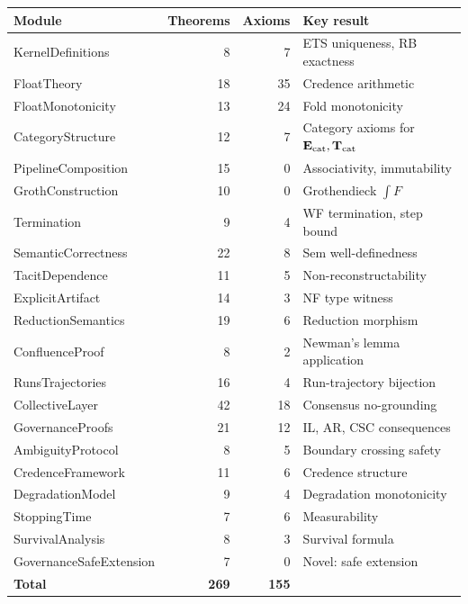 \begin{center}
\begin{tabular}{lrrl}
\toprule
Module & Theorems & Axioms & Key result \\
\midrule
KernelDefinitions & 8 & 7 & ETS uniqueness, RB exactness \\
FloatTheory & 18 & 35 & Credence arithmetic \\
FloatMonotonicity & 13 & 24 & Fold monotonicity \\
CategoryStructure & 12 & 7 & Category axioms for $\mathbf{E}_{\mathrm{cat}}, \mathbf{T}_{\mathrm{cat}}$ \\
PipelineComposition & 15 & 0 & Associativity, immutability \\
GrothConstruction & 10 & 0 & Grothendieck $\int F$ \\
Termination & 9 & 4 & WF termination, step bound \\
SemanticCorrectness & 22 & 8 & Sem well-definedness \\
TacitDependence & 11 & 5 & Non-reconstructability \\
ExplicitArtifact & 14 & 3 & NF type witness \\
ReductionSemantics & 19 & 6 & Reduction morphism \\
ConfluenceProof & 8 & 2 & Newman's lemma application \\
RunsTrajectories & 16 & 4 & Run-trajectory bijection \\
CollectiveLayer & 42 & 18 & Consensus no-grounding \\
GovernanceProofs & 21 & 12 & IL, AR, CSC consequences \\
AmbiguityProtocol & 8 & 5 & Boundary crossing safety \\
CredenceFramework & 11 & 6 & Credence structure \\
DegradationModel & 9 & 4 & Degradation monotonicity \\
StoppingTime & 7 & 6 & Measurability \\
SurvivalAnalysis & 8 & 3 & Survival formula \\
GovernanceSafeExtension & 7 & 0 & Novel: safe extension \\
\midrule
\textbf{Total} & \textbf{269} & \textbf{155} & \\
\bottomrule
\end{tabular}
\end{center}
